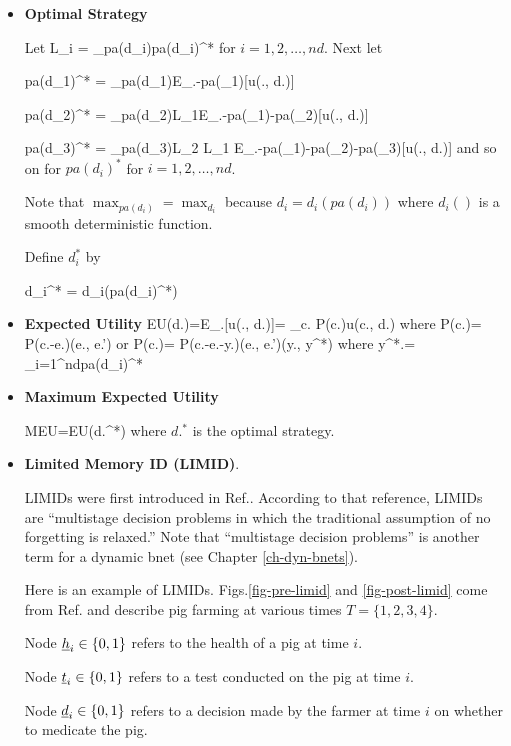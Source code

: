 \begin{itemize}


\item{\bf Optimal Strategy}

Let
\beq
L_i = \lim_{pa(d_i)\rarrow pa(d_i)^*}
\eeq
for $i=1,2, \ldots, nd$.
Next let



\beq
pa(d_1)^* = \argmax_{pa(d_1)}E_{\rvc.-pa(\rvd_1)}[u(\rvc., d.)]
\eeq


\beq 
pa(d_2)^* = \argmax_{pa(d_2)}L_1E_{\rvc.-pa(\rvd_1)-pa(\rvd_2)}[u(\rvc., d.)]
\eeq

\beq 
pa(d_3)^* = \argmax_{pa(d_3)}L_2 L_1 E_{\rvc.-pa(\rvd_1)-pa(\rvd_2)-pa(\rvd_3)}[u(\rvc., d.)]
\eeq
and so on for $pa(d_i)^*$ for $i=1,2, \ldots, nd$.

Note that $\max_{pa(d_i)} = \max_{d_i}$
because $d_i=d_i(pa(d_i)) $ where
$d_i()$ is a smooth deterministic function.

Define $d_i^*$ by

\beq
d_i^* = d_i(pa(d_i)^*)
\eeq


\item {\bf Expected Utility}
\beq
EU(d.)=E_{\rvc.}[u(\rvc., d.)]=
\sum_{c.} P(c.)u(c., d.)
\eeq
where 
\beq
P(c.)= P(c.-e.)\delta(e., e.')
\eeq
or
\beq
P(c.)= P(c.-e.-y.)\delta(e., e.')\delta(y., y^*)
\eeq
where 
\beq 
y^*.= \cup_{i=1}^{nd}pa(d_i)^*
\eeq


\item {\bf Maximum Expected Utility}

\beq
MEU=EU(d.^*)
\eeq
where $d.^*$ is the optimal strategy.


\item {\bf Limited Memory ID (LIMID)}. 

LIMIDs were first introduced 
in Ref.\cite{limid-one}. According to that reference, LIMIDs are \enquote{multistage decision problems in which the traditional assumption of no forgetting is
relaxed.}
Note that \enquote{multistage decision problems} is another term
for a dynamic bnet (see Chapter \ref{ch-dyn-bnets}).

Here is an example of LIMIDs.
Figs.\ref{fig-pre-limid} and \ref{fig-post-limid}
come from Ref.\cite{limid-one} and describe pig farming
at various times $T=\{1,2,3,4\}$.

Node ${\underline{h}}_i\in\{0,1\}$
refers to the health of a pig at time $i$.

Node ${\underline{t}}_i\in \{0,1\}$ refers to a test 
conducted on the pig at time $i$.

Node ${\underline{d}}_i\in \{0,1\}$ refers to a decision 
made by the farmer at time $i$ on whether to medicate the pig.


\end{itemize}
